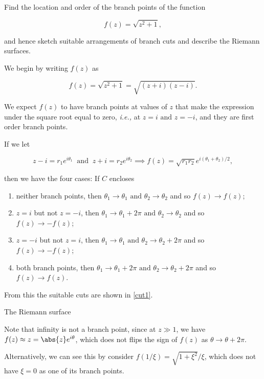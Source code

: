\documentclass[english,a4paper,12pt]{report}
\begin{document}

{Find the location and order of the branch points of the function

\begin{equation}
    f(z) = \sqrt{z^2+1}, 
\end{equation}

and hence sketch suitable arrangements of branch cuts and describe the Riemann surfaces.}
{We begin by writing \(f(z)\) as 

\begin{equation}
    f(z) = \sqrt{z^2+1} = \sqrt{(z+i)(z-i)}.  
\end{equation}

We expect \(f(z)\) to have branch points at values of \(z\) that make the expression under the square root equal to zero, \textit{i.e.,} at \(z = i \text { and } z = -i\), and they are first order branch points.

If we let 

\begin{equation}
    z - i  = r_1 e^{i \theta _{1} } ~\text { and }~ z+i = r_2 e^{i \theta _{2} } \implies f(z) = \sqrt{r_1 r_2 } e^{i(\theta _{1}+\theta _{2}  ) /2},     
\end{equation}

then we have the four cases: If \(C\) encloses

\begin{enumerate}
    \item neither branch points, then \(\theta _{1} \to \theta _{1} \text { and } \theta _{2}\to \theta _{2}    \) and so \(f(z) \to f(z)\);
    \item \(z = i\) but not \(z = -i\), then \(\theta _{1} \to \theta _{1}+2\pi   \text { and } \theta _{2} \to \theta _{2}  \) and so \(f(z) \to -f(z)\);
    \item \(z = -i\) but not \(z = i\), then \(\theta _{1} \to \theta _{1} \text { and } \theta _{2} \to \theta _{2} + 2\pi     \) and so \(f(z) \to -f(z)\); 
    \item both branch points, then \(\theta _{1} \to \theta _{1} + 2\pi   \text { and } \theta _{2} \to \theta _{2} + 2\pi   \) and so \(f(z) \to f(z)\).
\end{enumerate}

From this the suitable cuts are shown in \cref{cut1}.

The Riemann surface 

Note that infinity is not a branch point, since at \(z \gg 1\), we have \(f(z) \approx z = \abs{z}e^{i \theta }  \), which does not flips the sign of \(f(z)\) as \(\theta  \to \theta + 2\pi \). 

Alternatively, we can see this by consider \(f(1 /\xi )= \sqrt{1+\xi ^2} /\xi  \), which does not have \(\xi = 0\) as one of its branch points. 
} 
\end{document}
